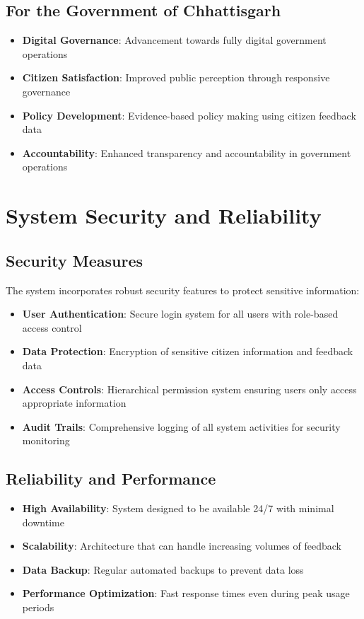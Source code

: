 \documentclass[12pt,a4paper]{article}
\begin{document}
\subsection{For the Government of Chhattisgarh}

\begin{itemize}[leftmargin=2em]
    \item \textbf{Digital Governance}: Advancement towards fully digital government operations
    \item \textbf{Citizen Satisfaction}: Improved public perception through responsive governance
    \item \textbf{Policy Development}: Evidence-based policy making using citizen feedback data
    \item \textbf{Accountability}: Enhanced transparency and accountability in government operations
\end{itemize}

\section{System Security and Reliability}

\subsection{Security Measures}

The system incorporates robust security features to protect sensitive information:

\begin{itemize}[leftmargin=2em]
    \item \textbf{User Authentication}: Secure login system for all users with role-based access control
    \item \textbf{Data Protection}: Encryption of sensitive citizen information and feedback data
    \item \textbf{Access Controls}: Hierarchical permission system ensuring users only access appropriate information
    \item \textbf{Audit Trails}: Comprehensive logging of all system activities for security monitoring
\end{itemize}

\subsection{Reliability and Performance}

\begin{itemize}[leftmargin=2em]
    \item \textbf{High Availability}: System designed to be available 24/7 with minimal downtime
    \item \textbf{Scalability}: Architecture that can handle increasing volumes of feedback
    \item \textbf{Data Backup}: Regular automated backups to prevent data loss
    \item \textbf{Performance Optimization}: Fast response times even during peak usage periods
\end{itemize}
\end{document}
